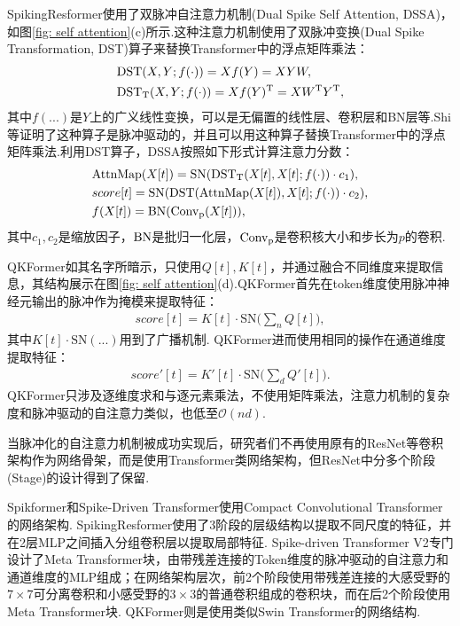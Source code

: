 \documentclass{SCIS2020cn}
\begin{document}
SpikingResformer\cite{Shi_2024_CVPR}使用了双脉冲自注意力机制(Dual Spike Self Attention, DSSA)，如图\ref{fig: self attention}(c)所示.这种注意力机制使用了双脉冲变换(Dual Spike Transformation, DST)算子来替换Transformer中的浮点矩阵乘法：
\begin{align}
&{\rm DST}(X, Y; f(\cdot))=Xf(Y)=XYW,\\
&{\rm DST_T}(X, Y; f(\cdot))=Xf(Y)^{\rm T}=XW^{\rm T}Y^{\rm T},
\end{align}
其中$f(...)$是$Y$上的广义线性变换，可以是无偏置的线性层、卷积层和BN层等.Shi等\cite{Shi_2024_CVPR}证明了这种算子是脉冲驱动的，并且可以用这种算子替换Transformer中的浮点矩阵乘法.利用DST算子，DSSA按照如下形式计算注意力分数：
\begin{align}
&{\rm AttnMap}(X[t])={\rm SN}({\rm DST_T}(X[t], X[t];f(\cdot)) \cdot c_1),\\
&score[t]={\rm SN}({\rm DST}({\rm AttnMap}(X[t]),X[t];f(\cdot)) \cdot c_2),\\
&f(X[t])={\rm BN}({\rm Conv_p}(X[t])),
\end{align}
其中$c_1, c_2$是缩放因子，${\rm BN}$是批归一化层，${\rm Conv_p}$是卷积核大小和步长为$p$的卷积.

QKFormer\cite{zhou2024qkformerhierarchicalspikingtransformer}如其名字所暗示，只使用$Q[t], K[t]$，并通过融合不同维度来提取信息，其结构展示在图\ref{fig: self attention}(d).QKFormer首先在token维度使用脉冲神经元输出的脉冲作为掩模来提取特征：
\begin{eqnarray}
score[t] = K[t] \cdot \text{SN}\Big(\sum_{n}{Q[t]}\Big),
\end{eqnarray}
其中$K[t] \cdot \text{SN}(...)$用到了广播机制.
QKFormer进而使用相同的操作在通道维度提取特征：
\begin{eqnarray}
score'[t] = K'[t] \cdot \text{SN}\Big(\sum_{d}{Q'[t]}\Big).
\end{eqnarray}
QKFormer只涉及逐维度求和与逐元素乘法，不使用矩阵乘法，注意力机制的复杂度和脉冲驱动的自注意力类似，也低至$\mathcal{O}(nd)$.



当脉冲化的自注意力机制被成功实现后，研究者们不再使用原有的ResNet等卷积架构作为网络骨架，而是使用Transformer类网络架构，但ResNet中分多个阶段(Stage)的设计得到了保留.

Spikformer\cite{zhou2023spikformer}和Spike-Driven Transformer\cite{NEURIPS2023_ca0f5358}使用Compact Convolutional Transformer\cite{hassani2022escapingbigdataparadigm}的网络架构.
SpikingResformer\cite{Shi_2024_CVPR}使用了3阶段的层级结构以提取不同尺度的特征，并在2层MLP之间插入分组卷积层以提取局部特征.
Spike-driven Transformer V2\cite{yao2024spikedriven}专门设计了Meta Transformer块，由带残差连接的Token维度的脉冲驱动的自注意力\cite{NEURIPS2023_ca0f5358}和通道维度的MLP组成；在网络架构层次，前2个阶段使用带残差连接的大感受野的$7\times7$可分离卷积和小感受野的$3\times3$的普通卷积组成的卷积块，而在后2个阶段使用Meta Transformer块.
QKFormer\cite{zhou2024qkformerhierarchicalspikingtransformer}则是使用类似Swin Transformer\cite{liu2021swin}的网络结构.
\end{document}
